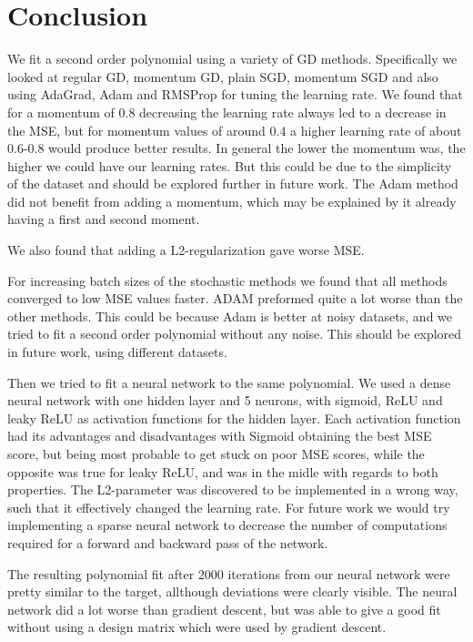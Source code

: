 \section{Conclusion}

We fit a second order polynomial using a variety of GD methods. Specifically we
looked at regular GD, momentum GD, plain SGD, momentum SGD and also using AdaGrad, Adam 
and RMSProp for tuning the learning rate. We found that for a momentum
of 0.8 decreasing the learning rate always led to a decrease in the MSE, but
for momentum values of around 0.4 a higher learning rate of about 0.6-0.8 would
produce better results. In general the lower the momentum was, the higher we
could have our learning rates. But this could be due to the simplicity of the
dataset and should be explored further in future work. The Adam method did not
benefit from adding a momentum, which may be explained by it already having a
first and second moment. 

We also found that adding a L2-regularization gave worse MSE. 

For increasing batch sizes of the stochastic methods we found that all methods
converged to low MSE values faster. ADAM preformed quite a lot worse than the other 
methods. This could be because Adam is better at noisy datasets, and we tried to
fit a second order polynomial without any noise. This should be explored in future
work, using different datasets.


Then we tried to fit a neural network to the same polynomial. We used a dense
neural network with one hidden layer and 5 neurons, with sigmoid, ReLU and
leaky ReLU as activation functions for the hidden layer. Each activation
function had its advantages and disadvantages with Sigmoid obtaining the best MSE score, but being
most probable to get stuck on poor MSE scores, while the opposite was true for leaky ReLU, and 
was in the midle with regards to both properties. 
The L2-parameter was discovered to be implemented in a wrong way, such that it effectively changed the 
learning rate. For future work we would try implementing a sparse neural network to
decrease the number of computations required for a forward and backward pass of
the network. 

The resulting polynomial fit after 2000 iterations from our neural network were pretty similar to the target, allthough deviations
were clearly visible. The neural network did a lot worse than gradient descent, but was able to give a good fit 
without using a design matrix which were used by gradient descent. 


